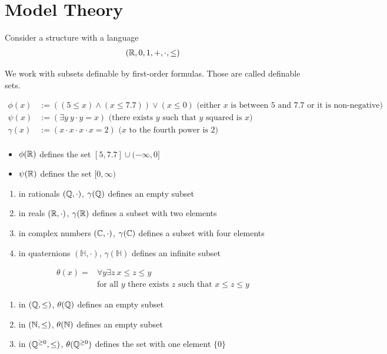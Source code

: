 \documentclass{amsart}
\newcommand{\paren}[1]{\left( #1 \right)}
\begin{document}
\section{Model Theory}

Consider a structure with a language
\begin{align*}
	(\mathbb{R}, 0, 1, +, \cdot, \leq)
\end{align*}

We work with subsets definable by first-order formulas.
Those are called definable sets.

\begin{align*}
	\phi(x) &:= \paren{(5 \leq x) \wedge (x \leq 7.7)} \vee (x \leq 0) \text { (either $x$ is between 5 and 7.7 or it is non-negative)}\\
	\psi(x) &:= (\exists y \ y \cdot y = x) \text { (there exists $y$ such that $y$ squared is $x$) }\\
	\gamma(x) &:= (x \cdot x \cdot x \cdot x = 2) \text { ($x$ to the fourth power is 2) }\\
\end{align*}


\begin{itemize}
	\item $\phi(\mathbb{R})$ defines the set $[5, 7.7] \cup (-\infty, 0]$
	\item $\psi(\mathbb{R})$ defines the set $[0, \infty)$
\end{itemize}
 
\begin{enumerate}
	\item in rationals $(\mathbb{Q}, \cdot)$, $\gamma(\mathbb{Q})$ defines an empty subset
	\item in reals $(\mathbb{R}, \cdot)$, $\gamma(\mathbb{R})$ defines a subset with two elements
	\item in complex numbers $(\mathbb{C}, \cdot)$, $\gamma(\mathbb{C})$ defines a subset with four elements
	\item in quaternions $(\mathbb H, \cdot)$, $\gamma(\mathbb H)$ defines an infinite subset
\end{enumerate}

\begin{align*}
	\theta(x) = &\forall y \exists z \ x \leq z \leq y \\
	&\text{for all $y$ there exists $z$ such that $x \leq z \leq y$}
\end{align*}

\begin{enumerate}
	\item in $(\mathbb{Q}, \leq)$, $\theta(\mathbb{Q})$ defines an empty subset
	\item in $(\mathbb{N}, \leq)$, $\theta(\mathbb{N})$ defines an empty subset
	\item in $(\mathbb{Q}^{\geq 0}, \leq)$, $\theta(\mathbb{Q}^{\geq 0})$ defines the set with one element $\{0\}$
\end{enumerate}
\end{document}
